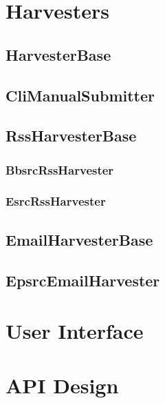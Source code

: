 \section{Harvesters}

\subsection{HarvesterBase}

\subsection{CliManualSubmitter}

\subsection{RssHarvesterBase}

\subsubsection{BbsrcRssHarvester}

\subsubsection{EsrcRssHarvester}

\subsection{EmailHarvesterBase}

\subsection{EpsrcEmailHarvester}

\section{User Interface}


\section{API Design}
